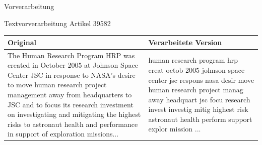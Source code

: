 \documentclass[aspectratio=169]{beamer} %
\begin{document}
\begin{frame}{Vorverarbeitung}
    \begin{exampleblock}{Textvorverarbeitung Artikel 39582}
        \begin{tabularx}{\textwidth}{>{\raggedright\arraybackslash}X >{\raggedright\arraybackslash}X}
            \textbf{Original} & \textbf{Verarbeitete Version}                                                                                                                                                                                                 \\ \hline
            The Human Research Program HRP was created in October 2005 at Johnson Space Center JSC in response to NASA's desire to move human research project management away from headquarters to JSC and to focus its research investment on investigating and mitigating the highest risks to astronaut health and performance in support of exploration missions...
                              &
            human research program hrp creat octob 2005 johnson space center jsc respons nasa desir move human research project manag away headquart jsc focu research invest investig mitig highest risk astronaut health perform support explor mission ... \\
        \end{tabularx}
    \end{exampleblock}
\end{frame}
\end{document}
